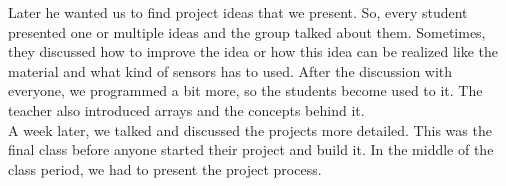 \documentclass[00_doc.tex]{subfiles}
\begin{document}
\begin{flushleft}
        Later he wanted us to find project ideas that we present. So, every student presented one 
        or multiple ideas and the group talked about them. Sometimes, they discussed how to improve 
        the idea or how this idea can be realized like the material and what kind of sensors has to
        used. After the discussion with everyone, we programmed a bit more, so the students become 
        used to it. The teacher also introduced arrays and the concepts behind it. \\

        A week later, we talked and discussed the projects more detailed. This was the final class 
        before anyone started their project and build it. In the middle of the class period, we had 
        to present the project process.  
    \end{flushleft}
\end{document}
